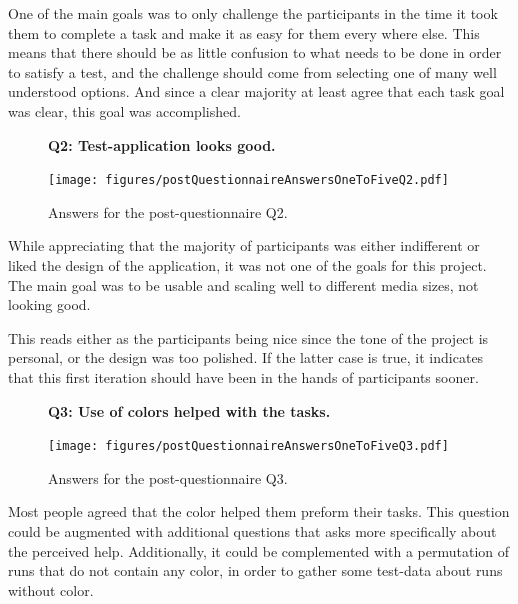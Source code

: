 \documentclass[nofilelist,dvipsnames]{cslthse-msc}
\begin{document}
        One of the main goals was to only challenge the participants in the
        time it took them to complete a task and make it as easy for them every
        where else. This means that there should be as little confusion to what
        needs to be done in order to satisfy a test, and the challenge should
        come from selecting one of many well understood options. And since a
        clear majority at least agree that each task goal was clear, this goal
        was accomplished.

				\begin{figure}[h!]
          \textbf{Q2: Test-application looks good.}
          \begin{center}
            \texttt{[image: figures/postQuestionnaireAnswersOneToFiveQ2.pdf]}
            \vspace{-1cm}
            \caption{Answers for the post-questionnaire Q2.}
          \end{center}
				\end{figure}

        While appreciating that the majority of participants was either
        indifferent or liked the design of the application, it was not one of
        the goals for this project. The main goal was to be usable and scaling
        well to different media sizes, not looking good.

        This reads either as the participants being nice since the tone of the
        project is personal, or the design was too polished. If the latter case
        is true, it indicates that this first iteration should have been in the
        hands of participants sooner.

				\begin{figure}[h!]
          \textbf{Q3: Use of colors helped with the tasks.}
          \begin{center}
            \texttt{[image: figures/postQuestionnaireAnswersOneToFiveQ3.pdf]}
            \vspace{-1cm}
            \caption{Answers for the post-questionnaire Q3.}
          \end{center}
				\end{figure}

        Most people agreed that the color helped them preform their tasks.
        This question could be augmented with additional questions that asks
        more specifically about the perceived help. Additionally, it could be
        complemented with a permutation of runs that do not contain any color,
        in order to gather some test-data about runs without color.
\end{document}
